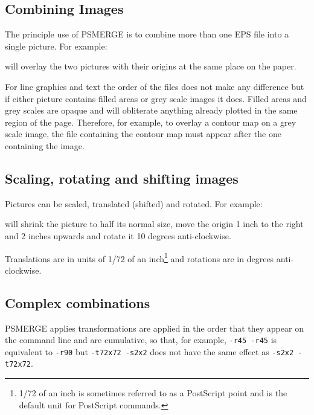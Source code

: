 \documentclass[twoside,11pt,nolof]{starlink}
\begin{document}
\subsection{Combining Images}
\label{combining_images}

The principle use of PSMERGE is to combine more than one EPS file into a
single picture.  For example:

\begin{terminalv}
\end{terminalv}

will overlay the two pictures with their origins at the same place on
the paper.

For line graphics and text the order of the files does not make any
difference but if either picture contains filled areas or grey scale
images it does.  Filled areas and grey scales are opaque and will
obliterate anything already plotted in the same region of the page.
Therefore, for example, to overlay a contour map on a grey scale image,
the file containing the contour map must appear after the one
containing the image.

\subsection{%
Scaling, rotating and shifting images}
\label{scaling_rotating_and_shifting}

Pictures can be scaled, translated (shifted) and rotated. For example:

\begin{terminalv}
\end{terminalv}

will shrink the picture to half its normal size, move the origin 1 inch to the
right and 2 inches upwards and rotate it 10 degrees anti-clockwise.

Translations are in units of 1/72 of an inch\footnote{1/72 of an inch
is sometimes referred to as a PostScript point and is the default unit
for PostScript commands.} and rotations are in degrees anti-clockwise.

\subsection{Complex combinations}

PSMERGE applies transformations are applied in the order that they
appear on the command line and are cumulative, so that, for example,
\texttt{-r45~-r45} is equivalent to \texttt{-r90} but
\texttt{-t72x72~-s2x2} does not have the same effect as
\texttt{-s2x2~-t72x72}.
\end{document}
